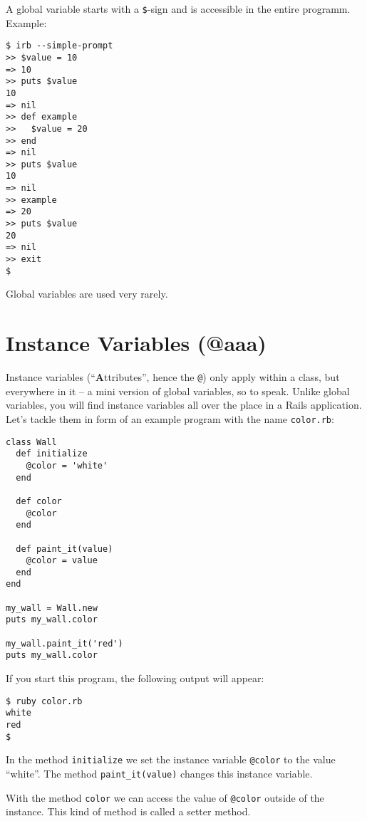 \documentclass[a4paper]{book}
\begin{document}
A global variable starts with a \texttt{\$}-sign and is accessible in the entire programm. Example:

\begin{shaded}\begin{verbatim}
$ irb --simple-prompt
>> $value = 10
=> 10
>> puts $value
10
=> nil
>> def example
>>   $value = 20
>> end
=> nil
>> puts $value
10
=> nil
>> example
=> 20
>> puts $value
20
=> nil
>> exit
$
\end{verbatim}\end{shaded}

Global variables are used very rarely.

\section{Instance Variables (@aaa)}\label{instance-variables-aaa}

Instance variables (“\textbf{A}ttributes”, hence the \texttt{@}) only apply within a class, but everywhere in it -- a mini version of global variables, so to speak. Unlike global variables, you will find instance variables all over the place in a Rails application. Let's tackle them in form of an example program with the name \texttt{color.rb}:

\begin{shaded}\begin{verbatim}
class Wall
  def initialize
    @color = 'white'
  end

  def color
    @color
  end

  def paint_it(value)
    @color = value
  end
end

my_wall = Wall.new
puts my_wall.color

my_wall.paint_it('red')
puts my_wall.color
\end{verbatim}\end{shaded}

If you start this program, the following output will appear:

\begin{shaded}\begin{verbatim}
$ ruby color.rb
white
red
$
\end{verbatim}\end{shaded}

In the method \texttt{initialize} we set the instance variable \texttt{@color} to the value “white”. The method \texttt{paint\_it(value)} changes this instance variable.

With the method \texttt{color} we can access the value of \texttt{@color} outside of the instance. This kind of method is called a setter method.
\end{document}
